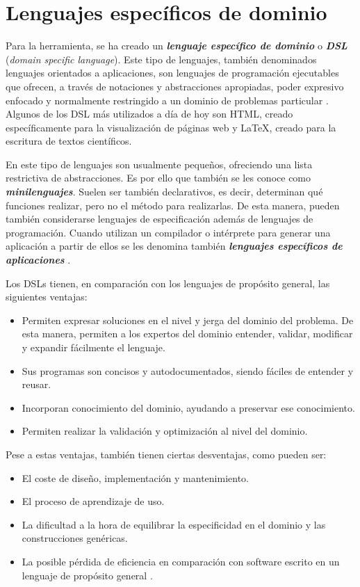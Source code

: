 
\chapter{Lenguajes específicos de dominio}\label{chap:DSL}

Para la herramienta, se ha creado un \textbf{\textit{lenguaje específico de dominio}} o \textbf{\textit{DSL}} 
(\textit{domain specific language}). Este tipo de lenguajes, también denominados lenguajes orientados a aplicaciones, 
son lenguajes de programación ejecutables que ofrecen, a través de notaciones y abstracciones apropiadas, poder
expresivo enfocado y normalmente restringido a un dominio de problemas particular \cite{deursen_klint_visser_2000}. 
Algunos de los DSL más utilizados a día de hoy son HTML, creado específicamente para la visualización de páginas web y 
LaTeX, creado para la escritura de textos científicos.

\vspace{10pt}
En este tipo de lenguajes son usualmente pequeños, ofreciendo una lista restrictiva de abstracciones. Es por ello que
también se les conoce como \textbf{\textit{minilenguajes}}. Suelen ser también declarativos, es decir, determinan qué
funciones realizar, pero no el método para realizarlas. De esta manera, pueden también considerarse lenguajes de
especificación además de lenguajes de programación. Cuando utilizan un compilador o intérprete para generar una
aplicación a partir de ellos se les denomina también \textbf{\textit{lenguajes específicos de aplicaciones}}
\cite{deursen_klint_visser_2000}.

\vspace{10pt}
Los DSLs tienen, en comparación con los lenguajes de propósito general, las siguientes ventajas:
\begin{itemize}
    \item Permiten expresar soluciones en el nivel y jerga del dominio del problema. De esta manera, permiten a los
    expertos del dominio entender, validar, modificar y expandir fácilmente el lenguaje.
    \item Sus programas son concisos y autodocumentados, siendo fáciles de entender y reusar.
    \item Incorporan conocimiento del dominio, ayudando a preservar ese conocimiento.
    \item Permiten realizar la validación y optimización al nivel del dominio.
\end{itemize}
Pese a estas ventajas, también tienen ciertas desventajas, como pueden ser:
\begin{itemize}
    \item El coste de diseño, implementación y mantenimiento.
    \item El proceso de aprendizaje de uso.
    \item La dificultad a la hora de equilibrar la especificidad en el dominio y las construcciones genéricas.
    \item La posible pérdida de eficiencia en comparación con software escrito en un lenguaje de propósito general
    \cite{deursen_klint_visser_2000}.
\end{itemize}

